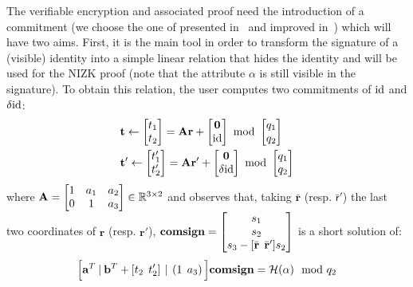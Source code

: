  The verifiable encryption and associated proof need the introduction of 
 a commitment (we choose the one of presented in~\cite{SCN:BDLOP18} and improved in~\cite{C:AttLyuSei20}) which will have two aims.
First, it is the main tool in order to transform the signature of a 
(visible) identity into a simple linear relation that hides the identity 
and will be used for the NIZK proof (note that the attribute $\alpha$ is 
still visible in the signature). To obtain this relation, the user 
computes two commitments of $\text{id}$ and $\delta \text{id}$:
\begin{align*} 
&\mathbf{t} \gets \begin{bmatrix}t_1\\ t_2\end{bmatrix} = \mathbf{A}\mathbf{r} +
\begin{bmatrix}\mathbf{0} \\ \text{id} \end{bmatrix} 
\!\!\mod \begin{bmatrix}q_1 \\ q_2 \end{bmatrix}
\\
&\mathbf{t'} \gets \begin{bmatrix}t'_1\\ t'_2\end{bmatrix} = \mathbf{A}\mathbf{r'} + \begin{bmatrix}\mathbf{0} \\ \delta\text{id} \end{bmatrix}
\!\!\mod \begin{bmatrix}q_1 \\ q_2 \end{bmatrix}
\end{align*}
where $\mathbf{A} = \begin{bmatrix} 1 & a_1 & a_2 \\ 0 & 1 & a_3 \end{bmatrix} \in \mathbb{R}^{3 \times 2}$
and observes that, taking $\bar{\mathbf{r}}$ (resp. $\bar{\mathsf{r}}'$) the last two coordinates of
$\mathbf{r}$ (resp. $\mathbf{r'}$),   $\mathbf{comsign} = \begin{bmatrix} s_{1} \\ s_{2} \\ s_{3} -
	[\bar{\mathbf{r}}\:\: \bar{\mathbf{r}}']s_{2}
\end{bmatrix}$ is a short solution of: \begin{equation}\label{eq:02_TechIntro_comsign}
\Big[\mathbf{a}^T\:|\: \mathbf{b}^T + \left[ t_2 \:\: t'_2\right] \:|\: \left(1 \:\: a_3\right)\Big] \mathbf{comsign} = \mathcal{H}(\alpha) \mod {q_2}
\end{equation}

